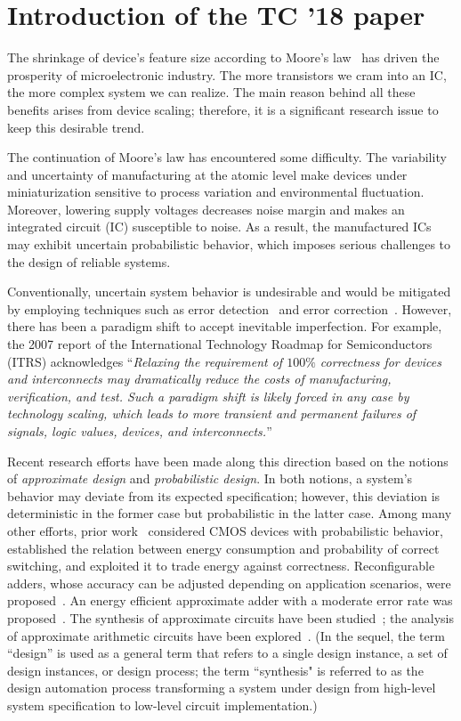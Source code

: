 \section{Introduction of the TC '18 paper}
The shrinkage of device's feature size according to Moore's law~\cite{Moore1965} has driven the prosperity of microelectronic industry.
The more transistors we cram into an IC, the more complex system we can realize.
The main reason behind all these benefits arises from device scaling;
therefore, it is a significant research issue to keep this desirable trend.

The continuation of Moore's law has encountered some difficulty.
The variability and uncertainty of manufacturing at the atomic level make devices under miniaturization sensitive to process variation and environmental fluctuation.
Moreover, lowering supply voltages decreases noise margin and makes an integrated circuit (IC) susceptible to noise.
As a result, the manufactured ICs may exhibit uncertain probabilistic behavior,
which imposes serious challenges to the design of reliable systems.

Conventionally, uncertain system behavior is undesirable and would be mitigated by employing techniques such as error detection~\cite{Constantinescu2003} and error correction~\cite{Mitra2006}.
However, there has been a paradigm shift to accept inevitable imperfection.
For example, the 2007 report of the International Technology Roadmap for Semiconductors (ITRS)
acknowledges
``\textit{Relaxing the requirement of $100\%$ correctness for devices and interconnects may dramatically reduce the costs of manufacturing, verification, and test.
    Such a paradigm shift is likely forced in any case by technology scaling, which leads to more transient and permanent failures of signals, logic values, devices, and interconnects.}''

Recent research efforts have been made along this direction based
on the notions of \textit{approximate design} and \textit{probabilistic design}.
In both notions, a system's behavior may deviate from its expected specification;
however, this deviation is deterministic in the former case but probabilistic in the latter case.
Among many other efforts, prior work~\cite{Chakrapani2006ProbDesign} considered CMOS devices with probabilistic behavior, established the relation between energy consumption and probability of correct switching, and exploited it to trade energy against correctness.
Reconfigurable adders, whose accuracy can be adjusted depending on application scenarios, were proposed~\cite{Kahng2012,Ye2013}.
An energy efficient approximate adder with a moderate error rate was proposed~\cite{Kim2013}.
The synthesis of approximate circuits have been studied~\cite{Venkatesan2011ApproxDesign,Venkataramani2012,Miao2013,Miao2014};
the analysis of approximate arithmetic circuits have been explored~\cite{Li2014,Mrazek2016,Rehman2016}.
(In the sequel, the term ``design'' is used as a general term that refers to a single design instance, a set of design instances, or design process;
the term ``synthesis" is referred to as the design automation process transforming a system under design from high-level system specification to low-level circuit implementation.)

